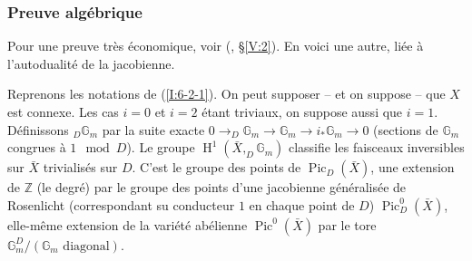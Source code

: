 \documentclass{book}
\DeclareMathOperator{\h}{H}
\DeclareMathOperator{\pic}{Pic}
\newcommand{\dG}{\mathbb{G}}
\newcommand{\dZ}{\mathbb{Z}}
\begin{document}
\subsubsection{Preuve algébrique}\label{I:6-2-3}

Pour une preuve très économique, voir (, \S\ref{V:2}). 
En voici une autre, liée à l'autodualité de la jacobienne. 

Reprenons les notations de (\ref{I:6-2-1}). On peut supposer -- et on suppose -- 
que $X$ est connexe. Les cas $i=0$ et $i=2$ étant triviaux, on suppose aussi 
que $i=1$. Définissons $_D\dG_m$ par la suite exacte 
$0\to _D\dG_m \to \dG_m \to i_*\dG_m\to 0$ (sections de $\dG_m$ congrues à 
$1\mod D$). Le groupe $\h^1(\bar X, _D\dG_m)$ classifie les faisceaux 
inversibles sur $\bar X$ trivialisés sur $D$. C'est le groupe des points de 
$\pic_D(\bar X)$, une extension de $\dZ$ (le degré) par le groupe des points 
d'une jacobienne généralisée de Rosenlicht (correspondant su conducteur 
$1$ en chaque point de $D$) $\pic_D^0(\bar X)$, elle-même extension de la 
variété abélienne $\pic^0(\bar X)$ par le tore 
$\dG_m^D/(\text{$\dG_m$ diagonal})$. 
\end{document}
